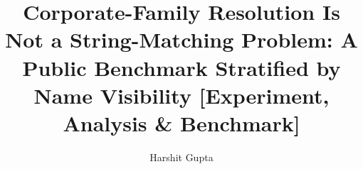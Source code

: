 \documentclass[sigconf, nonacm]{acmart}
\begin{document}
\title{Corporate-Family Resolution Is Not a String-Matching Problem:
A Public Benchmark Stratified by Name Visibility
[Experiment, Analysis \& Benchmark]}

\author{Harshit Gupta}

\begin{abstract}

\end{abstract}

\maketitle

\vldbtopmatter





\end{document}
